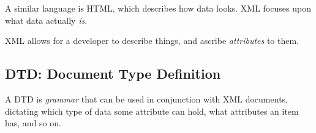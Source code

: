 \documentclass{article}
\begin{document}
A similar language is HTML, which describes how data looks. XML focuses upon what data actually \textit{is}.

XML allows for a developer to describe things, and ascribe \textit{attributes} to them. 

\subsection{DTD: Document Type Definition}

A DTD is \textit{grammar} that can be used in conjunction with XML documents, dictating which type of data some attribute can hold, what attributes an item has, and so on.
\end{document}
